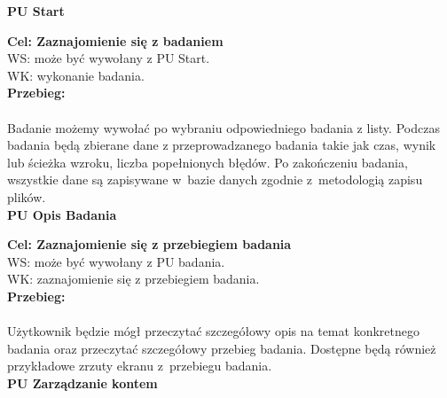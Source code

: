 \documentclass[12pt, letterpaper]{article}
\begin{document}
		
		\textbf{PU Start}
		
		\quad
		
		\textbf{Cel: Zaznajomienie się z badaniem}\\
		
		WS: może być wywołany z PU Start.\\
		
		WK: wykonanie badania.\\
		
		\textbf{Przebieg: }
\paragraph{}Badanie możemy wywołać po wybraniu odpowiedniego badania z listy. Podczas badania będą zbierane dane z przeprowadzanego badania takie jak czas, wynik lub ścieżka wzroku, liczba popełnionych błędów. Po zakończeniu badania, wszystkie dane są zapisywane w~bazie danych zgodnie z~metodologią zapisu plików.\\
		 
		
		\textbf{PU Opis Badania}
		
		\quad
		
		\textbf{Cel: Zaznajomienie się z przebiegiem badania}\\
		
		WS: może być wywołany z PU badania.\\
		
		WK: zaznajomienie się z przebiegiem badania.\\
		
		\textbf{Przebieg: }
\paragraph{}Użytkownik będzie mógł przeczytać szczegółowy opis na temat konkretnego badania oraz przeczytać szczegółowy przebieg badania. Dostępne będą również przykładowe zrzuty ekranu z~przebiegu badania.\\
		 
		
		\textbf{PU Zarządzanie kontem}
		
		\quad
		
\end{document}
